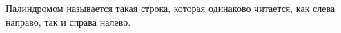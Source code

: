 Палиндромом называется такая строка, которая одинаково читается, как слева направо, так и справа налево.